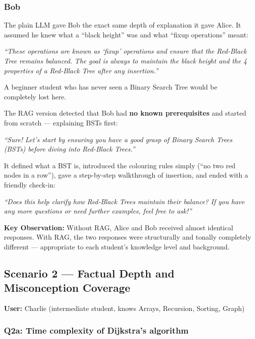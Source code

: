\documentclass[12pt,a4paper]{article}
\newenvironment{ragbox}[1]{%
  \begin{tcolorbox}[
    title={\textbf{#1}},
    colback=ragbg,
    colframe=ragborder,
    colbacktitle=ragborder,
    coltitle=white,
    left=6pt, right=6pt, top=4pt, bottom=4pt,
    boxrule=0.5pt,
    arc=3pt,
    fonttitle=\small\bfseries,
    breakable,
  ]
  \small
}{%
  \end{tcolorbox}
}
\newenvironment{plainbox}[1]{%
  \begin{tcolorbox}[
    title={\textbf{#1}},
    colback=plainbg,
    colframe=plainborder,
    colbacktitle=plainborder,
    coltitle=white,
    left=6pt, right=6pt, top=4pt, bottom=4pt,
    boxrule=0.5pt,
    arc=3pt,
    fonttitle=\small\bfseries,
    breakable,
  ]
  \small
}{%
  \end{tcolorbox}
}
\begin{document}
\subsubsection{Bob}

\begin{plainbox}{WITHOUT RAG --- Bob (Beginner)}
The plain LLM gave Bob the exact same depth of explanation it gave Alice. It
assumed he knew what a ``black height'' was and what ``fixup operations'' meant:

\medskip
\textit{``These operations are known as `fixup' operations and ensure that the
Red-Black Tree remains balanced. The goal is always to maintain the black height
and the 4 properties of a Red-Black Tree after any insertion.''}

\medskip
A beginner student who has never seen a Binary Search Tree would be completely
lost here.
\end{plainbox}

\begin{ragbox}{WITH RAG --- Bob (Beginner)}
The RAG version detected that Bob had \textbf{no known prerequisites} and
started from scratch --- explaining BSTs first:

\medskip
\textit{``Sure! Let's start by ensuring you have a good grasp of Binary Search
Trees (BSTs) before diving into Red-Black Trees.''}

\medskip
It defined what a BST is, introduced the colouring rules simply (``no two red
nodes in a row''), gave a step-by-step walkthrough of insertion, and ended with
a friendly check-in:

\medskip
\textit{``Does this help clarify how Red-Black Trees maintain their balance? If
you have any more questions or need further examples, feel free to ask!''}
\end{ragbox}

\textbf{Key Observation:} Without RAG, Alice and Bob received almost identical
responses. With RAG, the two responses were structurally and tonally completely
different --- appropriate to each student's knowledge level and background.

\subsection{Scenario 2 --- Factual Depth and Misconception Coverage}

\textbf{User:} Charlie (intermediate student, knows Arrays, Recursion, Sorting,
Graph)

\subsubsection{Q2a: Time complexity of Dijkstra's algorithm}
\end{document}
